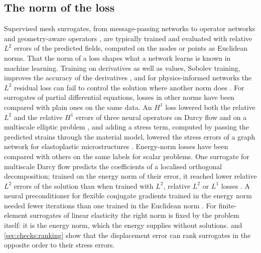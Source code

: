 \subsection{The norm of the loss}\label{sec:related:norm}
Supervised mesh surrogates, from message-passing networks \cite{Pfaff2021,Dalton2022} to
operator networks \cite{Lu2021DeepONet,Li2021FNO} and geometry-aware operators
\cite{He2024GeomDeepONet,Zeng2025PCNO,Liu2026GINOT}, are typically trained and evaluated
with relative $L^2$ errors of the predicted fields, computed on the nodes or points as
Euclidean norms. That the norm of a loss shapes what a
network learns is known in machine learning. Training on derivatives as well as values, Sobolev training, improves the accuracy of the derivatives \cite{Czarnecki2017}, and for
physics-informed networks the $L^2$ residual loss can fail to control the solution where
another norm does \cite{WangL2NeurIPS2022}. For surrogates of partial differential
equations, losses in other norms have been compared with plain ones on the same data. An $H^1$ loss
lowered both the relative $L^2$ and the relative $H^1$ errors of three neural
operators on Darcy flow and on a multiscale elliptic problem \cite{Liu2024Multiscale}, and
adding a stress term, computed by passing the predicted strains through the material model,
lowered the stress errors of a graph network for elastoplastic microstructures
\cite{Storm2024MicroGNN}. Energy-norm losses have been compared with others on the same labels for scalar problems. One surrogate for multiscale Darcy flow predicts the
coefficients of a localised orthogonal decomposition; trained on the energy norm of their
error, it reached lower relative $L^2$ errors of the solution than when trained with $L^2$, relative $L^2$ or $L^1$ losses \cite{Haltmayer2026LOD}. A neural preconditioner for flexible
conjugate gradients trained in the energy norm needed fewer iterations than one trained in
the Euclidean norm \cite{Rudikov2024FCGNO}. For finite-element surrogates of linear
elasticity the right norm is fixed by the problem itself: it is the energy norm, which the
energy supplies without solutions.  and \cref{sec:checks:ranking} show
that the displacement error can rank surrogates in the opposite order to their stress
errors.

